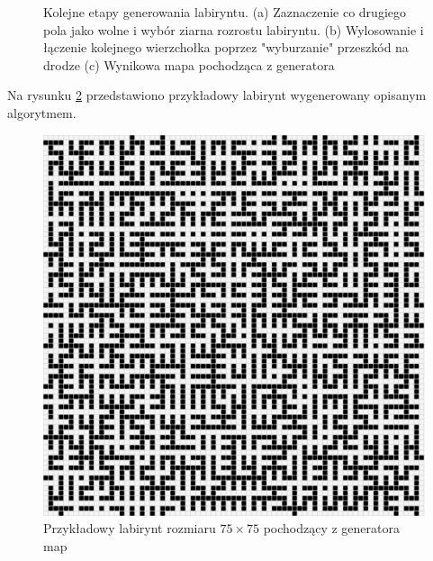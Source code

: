 \begin{figure}
    \centering
        \qquad
        \qquad
    \caption{Kolejne etapy generowania labiryntu.
    (a) Zaznaczenie co drugiego pola jako wolne i wybór ziarna rozrostu labiryntu.
    (b) Wylosowanie i łączenie kolejnego wierzchołka poprzez "wyburzanie" przeszkód na drodze
    (c) Wynikowa mapa pochodząca z generatora}
    \label{fig:etapy-generowania}
\end{figure}

Na rysunku \ref{fig:maze75-75} przedstawiono przykładowy labirynt wygenerowany opisanym algorytmem.
\begin{figure}
	\centering
	\includegraphics[width=0.6\columnwidth]{img/mazegen/maze-75-75}
	\caption{Przykładowy labirynt rozmiaru $75 \times 75$ pochodzący z generatora map}
	\label{fig:maze75-75}
\end{figure}
